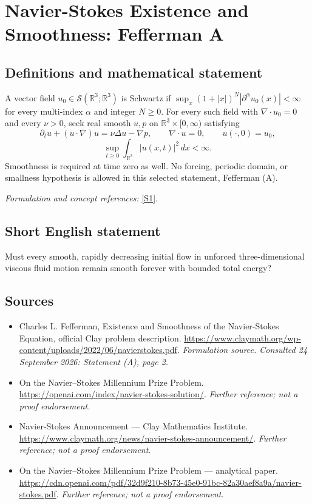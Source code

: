 \documentclass[11pt]{article}
\begin{document}
\section*{\texorpdfstring{Navier-Stokes Existence and Smoothness: Fefferman A}{Navier-Stokes Existence and Smoothness: Fefferman A}}\label{5}
\subsection{Definitions and mathematical statement}
A vector field $u_0\in\mathcal S({\mathbb{R}}^3;{\mathbb{R}}^3)$ is Schwartz if $\sup_x(1+|x|)^N|\partial^\alpha u_0(x)|<\infty$ for every multi-index $\alpha$ and integer $N\ge0$. For every such field with $\nabla\cdot u_0=0$ and every $\nu>0$, seek real smooth $u,p$ on ${\mathbb{R}}^3\times[0,\infty)$ satisfying
\[
 \partial_tu+(u\cdot\nabla)u=\nu\Delta u-\nabla p,\qquad
 \nabla\cdot u=0,\qquad u(\cdot,0)=u_0,
\]
\[
 \sup_{t\ge0}\int_{{\mathbb{R}}^3}|u(x,t)|^2\,dx<\infty.
\]
Smoothness is required at time zero as well. No forcing, periodic domain, or smallness hypothesis is allowed in this selected statement, Fefferman (A).
\par\smallskip\textit{Formulation and concept references:} \href{https://www.claymath.org/wp-content/uploads/2022/06/navierstokes.pdf}{[S1]}.

\subsection{Short English statement}
Must every smooth, rapidly decreasing initial flow in unforced three-dimensional viscous fluid motion remain smooth forever with bounded total energy?
\subsection{Sources}
\begin{itemize}
\item[S1]Charles L. Fefferman, Existence and Smoothness of the Navier-Stokes Equation, official Clay problem description.
\url{https://www.claymath.org/wp-content/uploads/2022/06/navierstokes.pdf}.
\textit{Formulation source. Consulted 24 September 2026: Statement (A), page 2.}
\item[S2]On the Navier–Stokes Millennium Prize Problem.
\url{https://openai.com/index/navier-stokes-solution/}.
\textit{Further reference; not a proof endorsement.}
\item[S3]Navier-Stokes Announcement — Clay Mathematics Institute.
\url{https://www.claymath.org/news/navier-stokes-announcement/}.
\textit{Further reference; not a proof endorsement.}
\item[S4]On the Navier–Stokes Millennium Prize Problem — analytical paper.
\url{https://cdn.openai.com/pdf/32d9f210-8b73-45e0-91bc-82a30aef8a9a/navier-stokes.pdf}.
\textit{Further reference; not a proof endorsement.}
\end{itemize}
\end{document}
